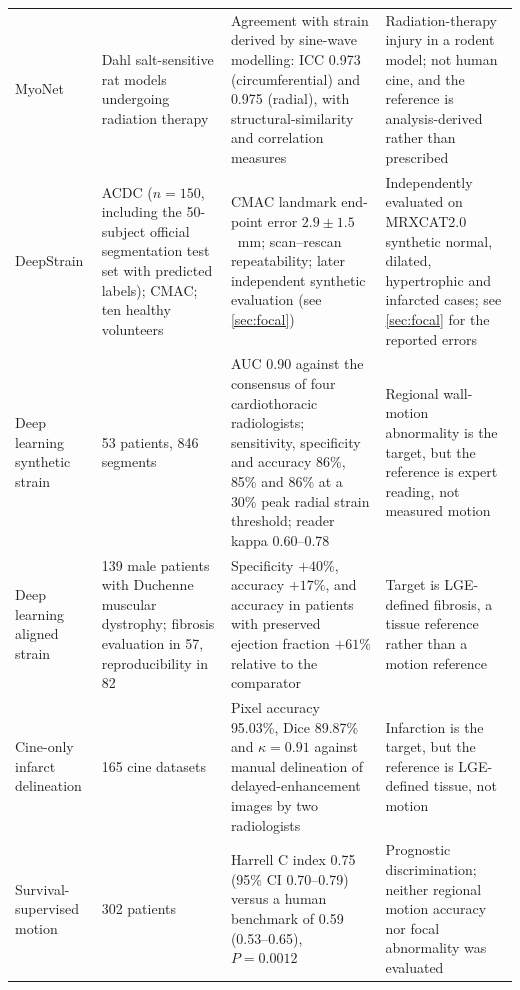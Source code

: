 \begin{longtable}{@{}L{0.145\textwidth}L{0.245\textwidth}L{0.275\textwidth}L{0.282\textwidth}@{}}
MyoNet & Dahl salt-sensitive rat models undergoing radiation therapy & Agreement with strain derived by sine-wave modelling: ICC 0.973 (circumferential) and 0.975 (radial), with structural-similarity and correlation measures & Radiation-therapy injury in a rodent model; not human cine, and the reference is analysis-derived rather than prescribed\\
DeepStrain & ACDC ($n=150$, including the 50-subject official segmentation test set with predicted labels); CMAC; ten healthy volunteers & CMAC landmark end-point error $2.9\pm1.5$~mm; scan--rescan repeatability; later independent synthetic evaluation (see \cref{sec:focal}) & Independently evaluated on MRXCAT2.0 synthetic normal, dilated, hypertrophic and infarcted cases; see \cref{sec:focal} for the reported errors\\
Deep learning synthetic strain & 53 patients, 846 segments & AUC 0.90 against the consensus of four cardiothoracic radiologists; sensitivity, specificity and accuracy 86\%, 85\% and 86\% at a 30\% peak radial strain threshold; reader kappa 0.60--0.78 & Regional wall-motion abnormality is the target, but the reference is expert reading, not measured motion\\
Deep learning aligned strain & 139 male patients with Duchenne muscular dystrophy; fibrosis evaluation in 57, reproducibility in 82 & Specificity $+40\%$, accuracy $+17\%$, and accuracy in patients with preserved ejection fraction $+61\%$ relative to the comparator & Target is LGE-defined fibrosis, a tissue reference rather than a motion reference\\
Cine-only infarct delineation & 165 cine datasets & Pixel accuracy 95.03\%, Dice 89.87\% and $\kappa=0.91$ against manual delineation of delayed-enhancement images by two radiologists & Infarction is the target, but the reference is LGE-defined tissue, not motion\\
Survival-supervised motion & 302 patients & Harrell C index 0.75 (95\% CI 0.70--0.79) versus a human benchmark of 0.59 (0.53--0.65), $P=0.0012$ & Prognostic discrimination; neither regional motion accuracy nor focal abnormality was evaluated\\
\bottomrule
\end{longtable}


